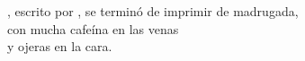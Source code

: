 \documentclass[11pt, oneside]{book}
\begin{document}

\tableofcontents %


\listofalgorithms %
\newpage

\listoftables %

\listoffigures %


\mainmatter %

\pagestyle{plain}










\begin{appendix}



\end{appendix}





\newpage
\thispagestyle{empty}
\begin{center}
\begin{minipage}{.6\linewidth}
\begin{center}
\vspace{3cm}
\begin{small}
\textit{\thetitle}, escrito por \theauthor , se terminó de imprimir de madrugada,\\ con mucha cafeína en las venas\\ y ojeras en la cara. %
\end{small}
\end{center}
\end{minipage}
\end{center}


\end{document}
